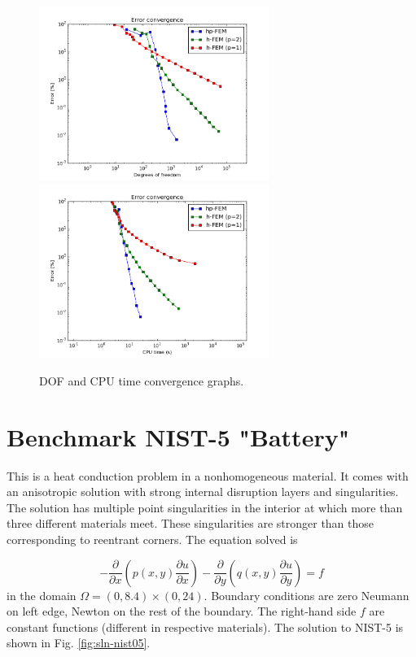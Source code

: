 \documentclass[12pt]{elsarticle}
\begin{document}
\begin{figure}[H]
\centering
\hspace{-50mm}
\includegraphics[width=7.5cm]{nist/nist-4/conv_dof_aniso.png}\ \
\hspace{-10mm}
\includegraphics[width=7.5cm]{nist/nist-4/conv_cpu_aniso.png}
\hspace{-50mm}
\caption{DOF and CPU time convergence graphs.}
\label{fig:nist-4-conv}
\end{figure}


\section{Benchmark NIST-5 "Battery"}
\label{sec:bench-5}

This is a heat conduction problem in a nonhomogeneous material.
It comes with an anisotropic solution with strong internal disruption
layers and singularities.
The solution has multiple point singularities in the interior at which
more than three different materials meet. These singularities are stronger than those
corresponding to reentrant corners. The equation solved is

\begin{equation} \label{heat-conduction}
-\frac{\partial }{\partial x}\left(p(x, y)\frac{\partial u}{\partial x}\right)
-\frac{\partial }{\partial y}\left(q(x, y)\frac{\partial u}{\partial y}\right) = f
\end{equation}
in the domain $\Omega = (0, 8.4) \times (0, 24)$. Boundary conditions are zero Neumann on left edge, Newton on the rest of the boundary.
The right-hand side $f$ are constant functions (different in respective materials).
The solution to NIST-5 is shown in Fig. \ref{fig:sln-nist05}.
\end{document}
